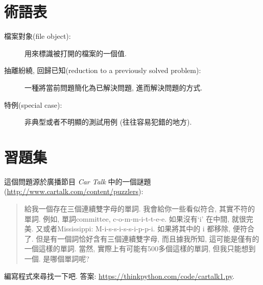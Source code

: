 \documentclass[10pt]{book}
\begin{document}
\section{術語表}

\begin{description}

\item[檔案對象(file object):] 用來標識被打開的檔案的一個值.

\item[抽離紛繞, 回歸已知(reduction to a previously solved problem):] 一種將當前問題簡化為已解決問題, 進而解決問題的方式.

\item[特例(special case):] 非典型或者不明顯的測試用例
(往往容易犯錯的地方).

\end{description}


\section{習題集}

\begin{exercise}

這個問題源於廣播節目 {\em Car Talk} 中的一個謎題
(\url{http://www.cartalk.com/content/puzzlers}):

\begin{quote}
給我一個存在三個連續雙字母的單詞. 
我會給你一些看似符合, 其實不符的單詞. 
例如, 單詞committee,  c-o-m-m-i-t-t-e-e. 
如果沒有`i' 在中間, 就很完美. 
又或者Mississippi: M-i-s-s-i-s-s-i-p-p-i.
如果將其中的 i 都移除, 便符合了. 
但是有一個詞恰好含有三個連續雙字母, 而且據我所知, 
這可能是僅有的一個這樣的單詞. 
當然, 實際上有可能有500多個這樣的單詞, 但我只能想到一個. 
是哪個單詞呢?
\end{quote}

編寫程式來尋找一下吧. 
答案: \url{https://thinkpython.com/code/cartalk1.py}.

\end{exercise}
\end{document}

